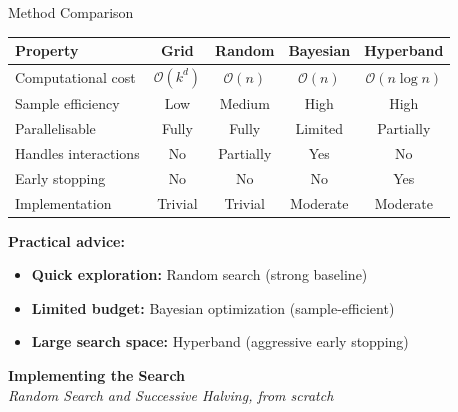 \documentclass[aspectratio=169,11pt]{beamer}
\newcommand{\emphc}[1]{\textcolor{harvardcrimson}{#1}}
\begin{document}
\begin{frame}{Method Comparison}
\begin{center}
\renewcommand{\arraystretch}{1.3}
{\small
\begin{tabular}{@{}lcccc@{}}
\toprule
\textbf{Property} & \textbf{Grid} & \textbf{Random} & \textbf{Bayesian} & \textbf{Hyperband} \\
\midrule
Computational cost & $\mathcal{O}(k^d)$ & $\mathcal{O}(n)$ & $\mathcal{O}(n)$ & $\mathcal{O}(n \log n)$ \\
Sample efficiency & Low & Medium & \emphc{High} & High \\
Parallelisable & Fully & Fully & Limited & Partially \\
Handles interactions & No & Partially & \emphc{Yes} & No \\
Early stopping & No & No & No & \emphc{Yes} \\
Implementation & Trivial & Trivial & Moderate & Moderate \\
\bottomrule
\end{tabular}
}
\end{center}

\vspace{0.4cm}
\textbf{Practical advice:}
\begin{itemize}
    \item \textbf{Quick exploration:} Random search (strong baseline)
    \item \textbf{Limited budget:} Bayesian optimization (sample-efficient)
    \item \textbf{Large search space:} Hyperband (aggressive early stopping)
\end{itemize}
\end{frame}


{
\begin{frame}[plain,c]
\begin{center}
{\Huge\bfseries Implementing the Search}\\[0.3cm]
{\large\itshape Random Search and Successive Halving, from scratch}
\end{center}
\end{frame}
}
\end{document}
